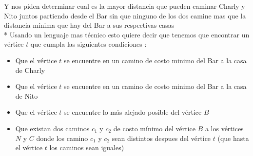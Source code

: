 \documentclass[10pt]{article}
\begin{document}
    \vspace*{0.5cm}
    \noindent Y nos piden determinar cual es la mayor distancia que pueden caminar Charly y Nito juntos partiendo desde el Bar sin que ninguno de los dos camine mas que la distancia m\'inima que hay del Bar a sus respectivas casas
    \\*
    Usando un lenguaje mas t\'ecnico esto quiere decir que tenemos  que encontrar un v\'ertice $t$ que cumpla las siguientes condiciones : 

    \begin{itemize}
        \item Que el v\'ertice $t$ se encuentre en un camino de costo minimo del Bar a la casa de Charly 
        \item Que el v\'ertice $t$ se encuentre en un camino de costo minimo del Bar a la casa de Nito
        \item Que el v\'ertice $t$ se encuentre lo m\'as alejado posible del v\'ertice $B$ 
        \item Que existan dos caminos $c_1$ y $c_2$ de costo m\'inimo del v\'ertice $B$ a los v\'ertices $N$ y $C$ donde los camino $c_1$ y $c_2$ sean distintos despues del v\'ertice $t$ (que hasta el v\'ertice $t$ los caminos sean iguales)  
    \end{itemize}
\end{document}
